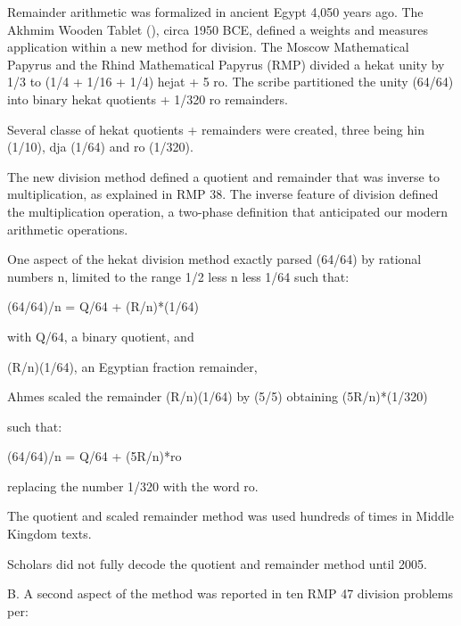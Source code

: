 \documentclass[12pt]{article}
\begin{document}

Remainder arithmetic was formalized in ancient Egypt 4,050 years ago. The Akhmim Wooden Tablet (), circa 1950 BCE, defined a weights and measures application within a new method for division. The Moscow Mathematical Papyrus and the Rhind Mathematical Papyrus (RMP) divided a hekat unity by 1/3 to (1/4 + 1/16 + 1/4) hejat + 5 ro. The scribe partitioned the unity (64/64) into binary hekat quotients +  1/320  ro remainders. 

Several classe of hekat quotients + remainders were created, three being hin (1/10), dja (1/64) and ro (1/320). 

The new division method defined a quotient and remainder that was inverse to multiplication, as explained in RMP 38. The inverse feature of division defined the multiplication operation, a two-phase definition that anticipated our modern arithmetic operations. 

One aspect of the hekat division method exactly parsed (64/64) by rational numbers n, limited to the range 1/2 less n less 1/64 such that:

(64/64)/n = Q/64 + (R/n)*(1/64)

with Q/64, a binary quotient, and  

(R/n)(1/64), an Egyptian fraction remainder, 

Ahmes scaled the remainder (R/n)(1/64) by (5/5) obtaining (5R/n)*(1/320)

such that:

(64/64)/n = Q/64 + (5R/n)*ro

replacing the number 1/320 with the word ro.

The quotient and scaled remainder method was used hundreds of times in Middle Kingdom texts. 

Scholars did not fully decode the quotient and remainder method until 2005. 

B. A second aspect of the method was reported in ten RMP 47 division problems per:
\end{document}
